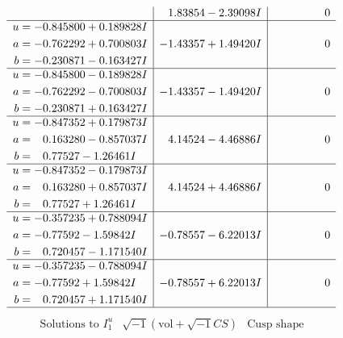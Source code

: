 \documentclass[1p]{elsarticle_modified}
\theoremstyle{definition}
\newcommand{\I}{\sqrt{-1}}
\begin{document}
$$\begin{array}{c|c|c}
 & \phantom{-}1.83854 - 2.39098 I & \phantom{-0.000000 } 0 \\ \hline\begin{aligned}
u &= -0.845800 + 0.189828 I \\
a &= -0.762292 + 0.700803 I \\
b &= -0.230871 - 0.163427 I\end{aligned}
 & -1.43357 + 1.49420 I & \phantom{-0.000000 } 0 \\ \hline\begin{aligned}
u &= -0.845800 - 0.189828 I \\
a &= -0.762292 - 0.700803 I \\
b &= -0.230871 + 0.163427 I\end{aligned}
 & -1.43357 - 1.49420 I & \phantom{-0.000000 } 0 \\ \hline\begin{aligned}
u &= -0.847352 + 0.179873 I \\
a &= \phantom{-}0.163280 - 0.857037 I \\
b &= \phantom{-}0.77527 - 1.26461 I\end{aligned}
 & \phantom{-}4.14524 - 4.46886 I & \phantom{-0.000000 } 0 \\ \hline\begin{aligned}
u &= -0.847352 - 0.179873 I \\
a &= \phantom{-}0.163280 + 0.857037 I \\
b &= \phantom{-}0.77527 + 1.26461 I\end{aligned}
 & \phantom{-}4.14524 + 4.46886 I & \phantom{-0.000000 } 0 \\ \hline\begin{aligned}
u &= -0.357235 + 0.788094 I \\
a &= -0.77592 - 1.59842 I \\
b &= \phantom{-}0.720457 - 1.171540 I\end{aligned}
 & -0.78557 - 6.22013 I & \phantom{-0.000000 } 0 \\ \hline\begin{aligned}
u &= -0.357235 - 0.788094 I \\
a &= -0.77592 + 1.59842 I \\
b &= \phantom{-}0.720457 + 1.171540 I\end{aligned}
 & -0.78557 + 6.22013 I & \phantom{-0.000000 } 0\\
 \hline 
 \end{array}$$\newpage$$\begin{array}{c|c|c}  
\text{Solutions to }I^u_{1}& \I (\text{vol} + \sqrt{-1}CS) & \text{Cusp shape}\\

\end{array}$$
\end{document}
